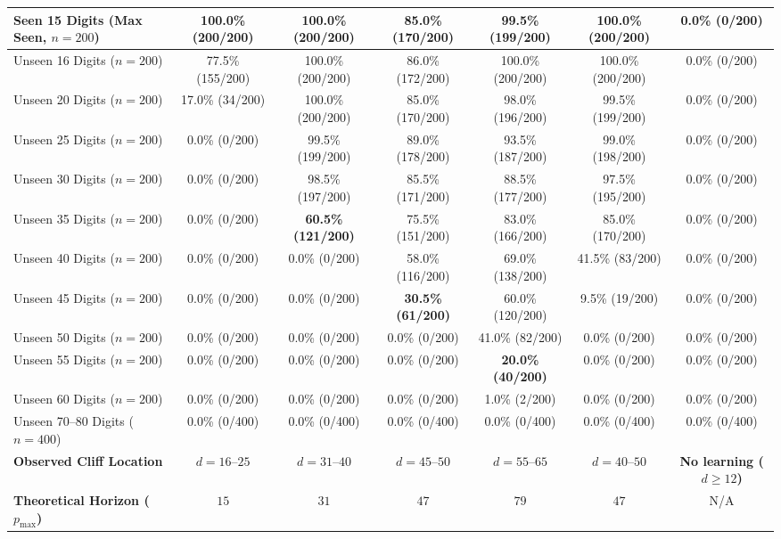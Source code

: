 \documentclass[10pt,twocolumn]{article}
\begin{document}
\begin{table}[t]
{\begin{tabular}{@{}lcccccc@{}}
Seen 15 Digits (Max Seen, $n=200$) & 100.0\% (200/200) & 100.0\% (200/200) & 85.0\% (170/200) & 99.5\% (199/200) & 100.0\% (200/200) & 0.0\% (0/200) \\
\midrule
Unseen 16 Digits ($n=200$) & 77.5\% (155/200) & 100.0\% (200/200) & 86.0\% (172/200) & 100.0\% (200/200) & 100.0\% (200/200) & 0.0\% (0/200) \\
Unseen 20 Digits ($n=200$) & 17.0\% (34/200) & 100.0\% (200/200) & 85.0\% (170/200) & 98.0\% (196/200) & 99.5\% (199/200) & 0.0\% (0/200) \\
Unseen 25 Digits ($n=200$) & 0.0\% (0/200) & 99.5\% (199/200) & 89.0\% (178/200) & 93.5\% (187/200) & 99.0\% (198/200) & 0.0\% (0/200) \\
Unseen 30 Digits ($n=200$) & 0.0\% (0/200) & 98.5\% (197/200) & 85.5\% (171/200) & 88.5\% (177/200) & 97.5\% (195/200) & 0.0\% (0/200) \\
Unseen 35 Digits ($n=200$) & 0.0\% (0/200) & \textbf{60.5\% (121/200)} & 75.5\% (151/200) & 83.0\% (166/200) & 85.0\% (170/200) & 0.0\% (0/200) \\
Unseen 40 Digits ($n=200$) & 0.0\% (0/200) & 0.0\% (0/200) & 58.0\% (116/200) & 69.0\% (138/200) & 41.5\% (83/200) & 0.0\% (0/200) \\
Unseen 45 Digits ($n=200$) & 0.0\% (0/200) & 0.0\% (0/200) & \textbf{30.5\% (61/200)} & 60.0\% (120/200) & 9.5\% (19/200) & 0.0\% (0/200) \\
Unseen 50 Digits ($n=200$) & 0.0\% (0/200) & 0.0\% (0/200) & 0.0\% (0/200) & 41.0\% (82/200) & 0.0\% (0/200) & 0.0\% (0/200) \\
Unseen 55 Digits ($n=200$) & 0.0\% (0/200) & 0.0\% (0/200) & 0.0\% (0/200) & \textbf{20.0\% (40/200)} & 0.0\% (0/200) & 0.0\% (0/200) \\
Unseen 60 Digits ($n=200$) & 0.0\% (0/200) & 0.0\% (0/200) & 0.0\% (0/200) & 1.0\% (2/200) & 0.0\% (0/200) & 0.0\% (0/200) \\
Unseen 70--80 Digits ($n=400$) & 0.0\% (0/400) & 0.0\% (0/400) & 0.0\% (0/400) & 0.0\% (0/400) & 0.0\% (0/400) & 0.0\% (0/400) \\
\midrule
\textbf{Observed Cliff Location} & \textbf{$d = 16\text{--}25$} & \textbf{$d = 31\text{--}40$} & \textbf{$d = 45\text{--}50$} & \textbf{$d = 55\text{--}65$} & \textbf{$d = 40\text{--}50$} & \textbf{No learning ($d \ge 12$)} \\
\textbf{Theoretical Horizon ($p_{\max}$)} & $15$ & $31$ & $47$ & $79$ & $47$ & N/A \\
\bottomrule
\end{tabular}%
}
\end{table}
\end{document}
